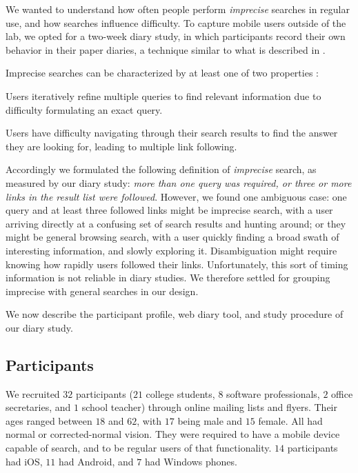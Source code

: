 We wanted to understand how often people perform \textit{imprecise} searches in regular use, and how searches influence difficulty. To capture mobile users outside of the lab, we opted for a two-week diary study, in which participants record their own behavior in their paper diaries, a technique similar to what is described in \cite{Sohn:2008}. 

Imprecise searches can be characterized by at least one of two properties \cite{Lee:2012}:
\begin{tight_enumerate}
\item Users iteratively refine multiple queries to find relevant information due to difficulty formulating an exact query. 
\item Users have difficulty navigating through their search results to find the answer they are looking for, leading to multiple link following.
\end{tight_enumerate}

Accordingly we formulated the following definition of \textit{imprecise} search, as measured by our diary study: \textit{more than one query was required, or three or more links in the result list were followed}. However, we found one ambiguous case: one query and at least three followed links might be imprecise search, with a user arriving directly at a confusing set of search results and hunting around; or they might be general browsing search, with a user quickly finding a broad swath of interesting information, and slowly exploring it. Disambiguation might require knowing how rapidly users followed their links. Unfortunately, this sort of timing information is not reliable in diary studies. We therefore settled for grouping imprecise with general searches in our design. 

We now describe the participant profile, web diary tool, and study procedure of our diary study.

\subsection{Participants}
We recruited $32$ participants ($21$ college students, $8$ software professionals, $2$ office secretaries, and $1$ school teacher) through online mailing lists and flyers. Their ages ranged between $18$ and $62$, with $17$ being male and $15$ female. All had normal or corrected-normal vision. They were required to have a mobile device capable of search, and to be regular users of that functionality. $14$ participants had iOS, $11$ had Android, and $7$ had Windows phones. 

